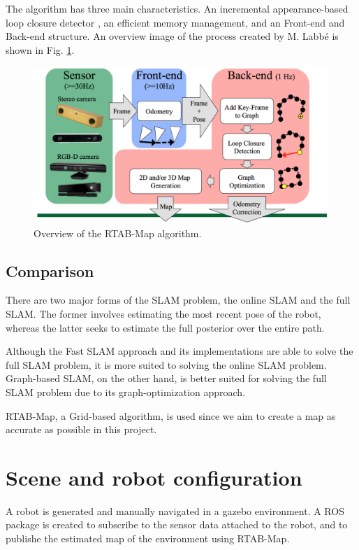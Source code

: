 \documentclass[10pt,journal,compsoc]{IEEEtran}
\begin{document}
The algorithm has three main characteristics. An incremental appearance-based loop closure detector \cite{labbe14online}, an efficient memory management, and an Front-end and Back-end structure. An overview image of the process created by M. Labbé \cite{Labbe:2015:IntRoLab:RTABMap} is shown in Fig. \ref{fig:rtabmap-overview}.

\begin{figure}[thpb]
      \centering
      \includegraphics[width=0.9\linewidth]{rtabmap-overview}
      \caption{Overview of the RTAB-Map algorithm.}
      \label{fig:rtabmap-overview}
\end{figure}

\subsection{Comparison}
There are two major forms of the SLAM problem, the online SLAM and the full SLAM. The former involves estimating the most recent pose of the robot, whereas the latter seeks to estimate the full posterior over the entire path.

Although the Fast SLAM approach and its implementations are able to solve the full SLAM problem, it is more suited to solving the online SLAM problem. Graph-based SLAM, on the other hand, is better suited for solving the full SLAM problem due to its graph-optimization approach. 

RTAB-Map, a Grid-based algorithm, is used since we aim to create a map as accurate as possible in this project.

\section{Scene and robot configuration}
A robot is generated and manually navigated in a gazebo environment. A ROS package is created to subscribe to the sensor data attached to the robot, and to publishe the estimated map of the environment using RTAB-Map.
\end{document}

